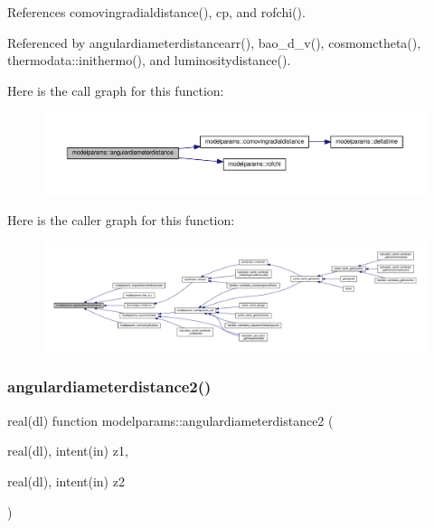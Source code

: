 References comovingradialdistance(), cp, and rofchi().



Referenced by angulardiameterdistancearr(), bao\+\_\+d\+\_\+v(), cosmomctheta(), thermodata\+::inithermo(), and luminositydistance().

Here is the call graph for this function\+:
\nopagebreak
\begin{figure}[H]
\begin{center}
\leavevmode
\includegraphics[width=350pt]{namespacemodelparams_a63c764e54b9b02649d00f8071cb9297f_cgraph}
\end{center}
\end{figure}
Here is the caller graph for this function\+:
\nopagebreak
\begin{figure}[H]
\begin{center}
\leavevmode
\includegraphics[width=350pt]{namespacemodelparams_a63c764e54b9b02649d00f8071cb9297f_icgraph}
\end{center}
\end{figure}
\mbox{\label{namespacemodelparams_a74645c7e2e48bb3d57da7da5383799ed}} 
\subsubsection{\texorpdfstring{angulardiameterdistance2()}{angulardiameterdistance2()}}
{\footnotesize\ttfamily real(dl) function modelparams\+::angulardiameterdistance2 (\begin{DoxyParamCaption}\item[{real(dl), intent(in)}]{z1,  }\item[{real(dl), intent(in)}]{z2 }\end{DoxyParamCaption})}



